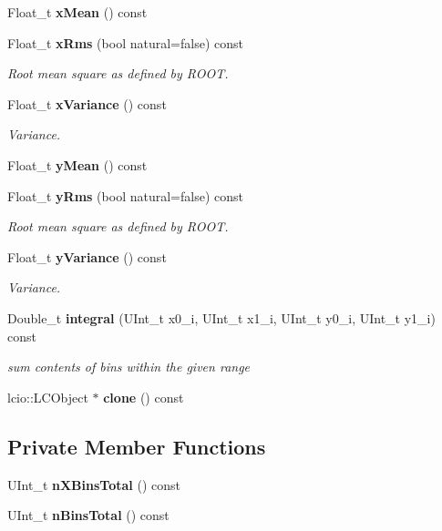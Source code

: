 \begin{DoxyCompactItemize}
\item 
Float\-\_\-t {\bfseries x\-Mean} () const \label{classhistmgr_1_1FloatHistogram2D_a7942a45e5b0dd5e353a0d58b62b8de5c}

\item 
Float\-\_\-t {\bf x\-Rms} (bool natural=false) const 
\begin{DoxyCompactList}\small\item\em Root mean square as defined by R\-O\-O\-T. \end{DoxyCompactList}\item 
Float\-\_\-t {\bf x\-Variance} () const 
\begin{DoxyCompactList}\small\item\em Variance. \end{DoxyCompactList}\item 
Float\-\_\-t {\bfseries y\-Mean} () const \label{classhistmgr_1_1FloatHistogram2D_a10414e7c9ad34612626fd74572f8add9}

\item 
Float\-\_\-t {\bf y\-Rms} (bool natural=false) const 
\begin{DoxyCompactList}\small\item\em Root mean square as defined by R\-O\-O\-T. \end{DoxyCompactList}\item 
Float\-\_\-t {\bf y\-Variance} () const 
\begin{DoxyCompactList}\small\item\em Variance. \end{DoxyCompactList}\item 
Double\-\_\-t {\bf integral} (U\-Int\-\_\-t x0\-\_\-i, U\-Int\-\_\-t x1\-\_\-i, U\-Int\-\_\-t y0\-\_\-i, U\-Int\-\_\-t y1\-\_\-i) const 
\begin{DoxyCompactList}\small\item\em sum contents of bins within the given range \end{DoxyCompactList}\item 
lcio\-::\-L\-C\-Object $\ast$ {\bfseries clone} () const \label{classhistmgr_1_1FloatHistogram2D_a3d2ff7763edb2ad062006f7170a32285}

\end{DoxyCompactItemize}
\subsection*{Private Member Functions}
\begin{DoxyCompactItemize}
\item 
U\-Int\-\_\-t {\bfseries n\-X\-Bins\-Total} () const \label{classhistmgr_1_1FloatHistogram2D_af5a817d2d34a4ee5ecde6dc84b4d5996}

\item 
U\-Int\-\_\-t {\bfseries n\-Bins\-Total} () const \label{classhistmgr_1_1FloatHistogram2D_a378ba87874ae6a6d6a2eefc558d3bb7e}

\end{DoxyCompactItemize}
